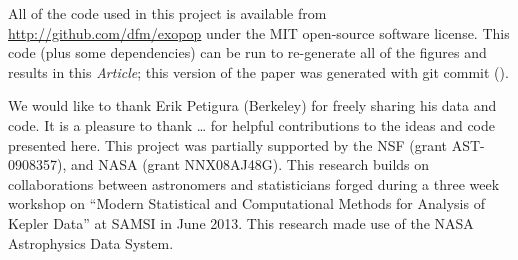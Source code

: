 \documentclass[12pt,preprint]{aastex}
\newcommand{\project}[1]{{\sffamily #1}}
\newcommand{\paper}{\textsl{Article}}
\begin{document}
All of the code used in this project is available from
\url{http://github.com/dfm/exopop} under the MIT open-source software license.
This code (plus some dependencies) can be run to re-generate all of the
figures and results in this \paper; this version of the paper was generated
with git commit \texttt{\githash} (\gitdate).

\acknowledgments
We would like to thank Erik Petigura (Berkeley) for freely sharing his data
and code.
It is a pleasure to thank
\ldots
for helpful contributions to the ideas and code presented here.
This project was partially supported by the NSF (grant AST-0908357), and NASA
(grant NNX08AJ48G).
This research builds on collaborations between astronomers and statisticians
forged during a three week workshop on ``Modern Statistical and Computational
Methods for Analysis of Kepler Data'' at SAMSI in June 2013.
This research made use of the NASA \project{Astrophysics Data System}.
\end{document}

